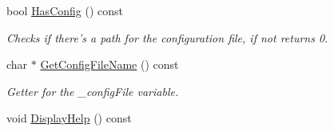 \begin{DoxyCompactItemize}
bool \hyperlink{class_command_line_a1ef3920d53a63e97dbc3c823b1bf5060}{Has\-Config} () const 
\begin{DoxyCompactList}\small\item\em Checks if there's a path for the configuration file, if not returns 0. \end{DoxyCompactList}\item 
char $\ast$ \hyperlink{class_command_line_af0398729ceaef3b9660915eb7ae730b8}{Get\-Config\-File\-Name} () const 
\begin{DoxyCompactList}\small\item\em Getter for the \-\_\-config\-File variable. \end{DoxyCompactList}\item 
\hypertarget{class_command_line_a6709a77ba7fc2d93e79526583481616b}{void \hyperlink{class_command_line_a6709a77ba7fc2d93e79526583481616b}{Display\-Help} () const }\label{class_command_line_a6709a77ba7fc2d93e79526583481616b}


\end{DoxyCompactItemize}
